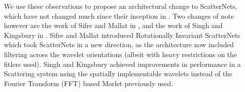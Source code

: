 We use these observations to propose an architectural change to ScatterNets,
which have not changed much since their inception in \cite{mallat_group_2012}. 
Two changes of note however are the work of Sifre and Mallat in
\cite{sifre_rotation_2013}, and the work of Singh and Kingsbury in
\cite{singh_dual-tree_2017}.  Sifre and Mallat introduced Rotationally Invariant
ScatterNets which took ScatterNets in a new direction, as the architecture now
included filtering across the wavelet orientations (albeit with heavy
restrictions on the fitlers used).  Singh and Kingsbury achieved improvements in
performance in a Scattering system using the spatially implementable \DTCWT
\cite{kingsbury_complex_2001} wavelets instead of the Fourier Transform (FFT)
based Morlet previously used.






